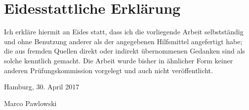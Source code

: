\section{Eidesstattliche Erklärung}
Ich erkl\"are hiermit an Eides statt, dass ich die vorliegende Arbeit selbstst\"andig und ohne Benutzung anderer als der angegebenen Hilfsmittel angefertigt habe; die aus fremden Quellen direkt oder indirekt \"ubernommenen Gedanken sind als solche kenntlich gemacht. Die Arbeit wurde bisher in \"ahnlicher Form keiner anderen Pr\"ufungskommission vorgelegt und auch nicht ver\"offentlicht.

\bigskip
\bigskip
\bigskip
\bigskip
	
\begin{multicols}{2}
  \raggedright
  Hamburg, 30. April 2017
  
  \raggedleft
  Marco Pawlowski
\end{multicols}
